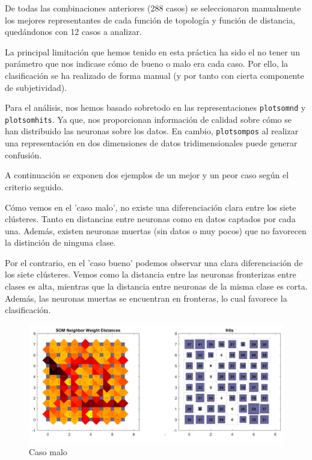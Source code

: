\documentclass[a4paper,12pt,titlepage]{article}
\begin{document}
De todas las combinaciones anteriores (288 casos) se seleccionaron manualmente los mejores representantes de cada función de topología y función de distancia, quedándonos con 12 casos a analizar.

La principal limitación que hemos tenido en esta práctica ha sido el no tener un parámetro que nos indicase cómo de bueno o malo era cada caso. Por ello, la clasificación se ha realizado de forma manual (y por tanto con cierta componente de subjetividad).

Para el análisis, nos hemos basado sobretodo en las representaciones \lstinline|plotsomnd| y \lstinline|plotsomhits|. Ya que, nos proporcionan información de calidad sobre cómo se han distribuido las neuronas sobre los datos. En cambio, \lstinline|plotsompos| al realizar una representación en 
dos dimensiones de datos tridimensionales puede generar confusión.

A continuación se exponen dos ejemplos de un mejor y un peor caso según el criterio seguido. 

Cómo vemos en el 'caso malo', no existe una diferenciación clara entre los siete clústeres. Tanto en distancias entre neuronas como en datos captados por cada una. Además, existen neuronas muertas (sin datos o muy pocos) que no favorecen la distinción de ninguna clase.

Por el contrario, en el 'caso bueno' podemos observar una clara diferenciación de los siete clústeres. Vemos como la distancia entre las neuronas fronterizas entre clases es alta, mientras que la distancia entre neuronas de la misma clase es corta. Además, las neuronas muertas se encuentran en fronteras, lo cual favorece la clasificación.

\begin{figure}[!ht]
	\centering
	\label{fig:patternnet}
	\includegraphics[width=\textwidth]{caso-malo.jpg}
	\caption{Caso malo}
\end{figure}
\end{document}
